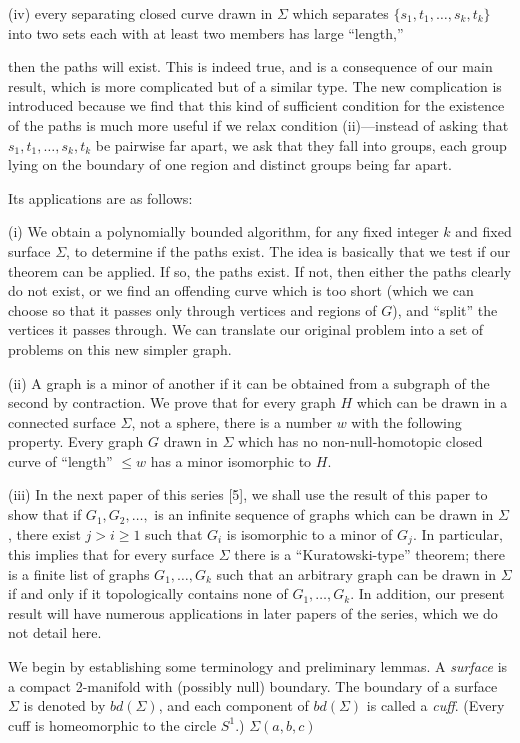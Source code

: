 \hspace*{12pt}(iv) every separating closed curve drawn in $\Sigma$ which separates $\{s_1, t_1, \dots, s_k, t_k\}$ into two sets each with at least two members has large ``length,''

then the paths will exist. This is indeed true, and is a consequence of our main result, which is more complicated but of a similar type. The new complication is introduced because we find that this kind of sufficient condition for the existence of the paths is much more useful if we relax condition (ii)---instead of asking that $s_1, t_1, \dots, s_k, t_k$ be pairwise far apart, we ask that they fall into groups, each group lying on the boundary of one region and distinct groups being far apart.

Its applications are as follows:

\hspace*{12pt}(i) We obtain a polynomially bounded algorithm, for any fixed integer $k$ and fixed surface $\Sigma$, to determine if the paths exist. The idea is basically that we test if our theorem can be applied. If so, the paths exist. If not, then either the paths clearly do not exist, or we find an offending curve which is too short (which we can choose so that it passes only through vertices and regions of $G$), and ``split'' the vertices it passes through. We can translate our original problem into a set of problems on this new simpler graph.

\hspace*{12pt}(ii) A graph is a minor of another if it can be obtained from a subgraph of the second by contraction. We prove that for every graph $H$ which can be drawn in a connected surface $\Sigma$, not a sphere, there is a number $w$ with the following property. Every graph $G$ drawn in $\Sigma$ which has no non-null-homotopic closed curve of ``length'' $\le w$ has a minor isomorphic to $H$.

\hspace*{12pt}(iii) In the next paper of this series [5], we shall use the result of this paper to show that if $G_1, G_2, \dots,$ is an infinite sequence of graphs which can be drawn in $\Sigma$, there exist $j > i \ge 1$ such that $G_i$ is isomorphic to a minor of $G_j$. In particular, this implies that for every surface $\Sigma$ there is a ``Kuratowski-type'' theorem; there is a finite list of graphs $G_1, \dots, G_k$ such that an arbitrary graph can be drawn in $\Sigma$ if and only if it topologically contains none of $G_1, \dots, G_k$. In addition, our present result will have numerous applications in later papers of the series, which we do not detail here.


We begin by establishing some terminology and preliminary lemmas. A \textit{surface} is a compact 2-manifold with (possibly null) boundary. The boundary of a surface $\Sigma$ is denoted by $bd(\Sigma)$, and each component of $bd(\Sigma)$ is called a \textit{cuff}. (Every cuff is homeomorphic to the circle $S^1$.) $\Sigma(a, b, c)$
